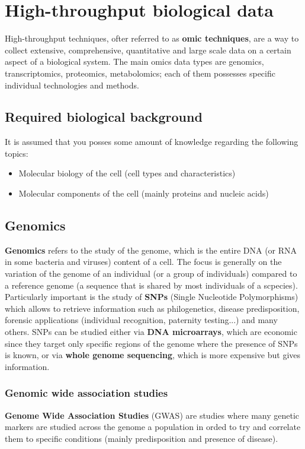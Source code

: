 \graphicspath{{chapters/images/01/}}

\chapter{High-throughput biological data}
  High-throughput techniques, ofter referred to as \textbf{omic techniques}, are a way to collect extensive, comprehensive, quantitative and large scale data on a certain aspect of a biological system. The main omics data types are genomics, transcriptomics, proteomics, metabolomics; each of them possesses specific individual technologies and methods. 

  \section{Required biological background}
    It is assumed that you posses some amount of knowledge regarding the following topics:
    \begin{itemize}
      \item Molecular biology of the cell (cell types and characteristics)
      \item Molecular components of the cell (mainly proteins and nucleic acids)
    \end{itemize}

  \section{Genomics}
    \textbf{Genomics} refers to the study of the genome, which is the entire DNA (or RNA in some bacteria and viruses) content of a cell. The focus is generally on the variation of the genome of an individual (or a group of individuals) compared to a reference genome (a sequence that is shared by most individuals of a scpecies). Particularly important is the study of \textbf{SNPs} (Single Nucleotide Polymorphisms) which allows to retrieve information such as philogenetics, disease predisposition, forensic applications (individual recognition, paternity testing...) and many others. SNPs can be studied either via \textbf{DNA microarrays}, which are economic since they target only specific regions of the genome where the presence of SNPs is known, or via \textbf{whole genome sequencing}, which is more expensive but gives information. 
    
    \subsection{Genomic wide association studies}
      \textbf{Genome Wide Association Studies} (GWAS) are studies where many genetic markers are studied across the genome a population in orded to try and correlate them to specific conditions (mainly predisposition and presence of disease).

